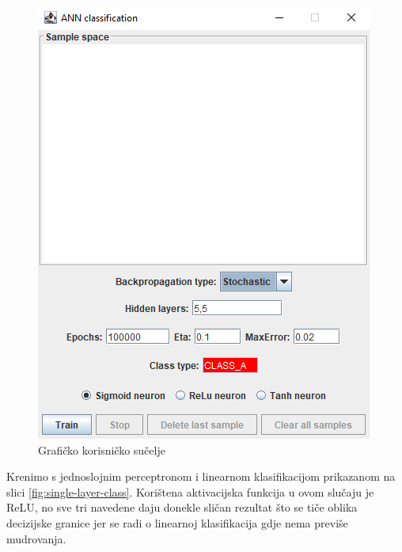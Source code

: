 \documentclass[times, utf8, zavrsni]{fer}
\begin{document}
\begin{figure}[H]
    \centering
    \includegraphics[scale=0.6]{img/gui.png}
    \caption[Caption for LOF]{Grafičko korisničko sučelje}
    \label{fig:gui}
\end{figure}

Krenimo s jednoslojnim perceptronom i linearnom klasifikacijom prikazanom na slici \ref{fig:single-layer-class}. Korištena aktivacijska funkcija u ovom slučaju je ReLU, no sve tri navedene daju donekle sličan rezultat što se tiče oblika decizijske granice jer se radi o linearnoj klasifikacija gdje nema previše mudrovanja.
\end{document}
